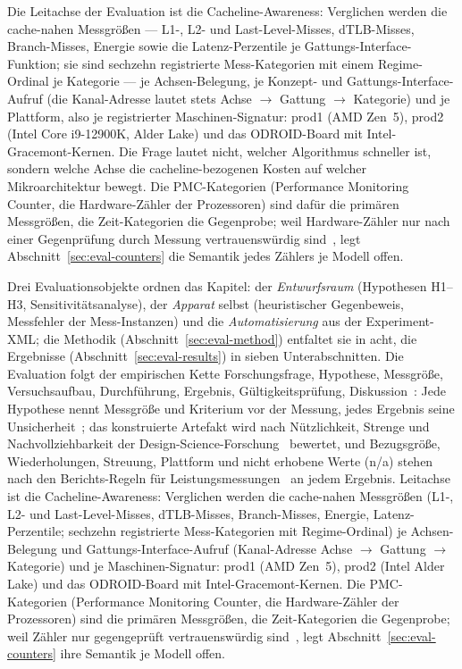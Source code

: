 \begin{nurlang}
Die Leitachse der Evaluation ist die Cacheline-Awareness: Verglichen werden die cache-nahen
Messgrößen --- L1-, L2- und Last-Level-Misses, dTLB-Misses, Branch-Misses, Energie sowie die
Latenz-Perzentile je Gattungs-Interface-Funktion; sie sind sechzehn registrierte Mess-Kategorien mit einem
Regime-Ordinal je Kategorie --- je Achsen-Belegung, je Konzept- und Gattungs-Interface-Aufruf (die
Kanal-Adresse lautet stets Achse $\to$ Gattung $\to$ Kategorie) und je Plattform, also je registrierter
Maschinen-Signatur: prod1 (AMD Zen~5), prod2 (Intel Core i9-12900K, Alder Lake) und das ODROID-Board
mit Intel-Gracemont-Kernen. Die Frage lautet nicht, welcher Algorithmus schneller ist, sondern welche
Achse die cacheline-bezogenen Kosten auf welcher Mikroarchitektur bewegt. Die PMC-Kategorien
(Performance Monitoring Counter, die Hardware-Zähler der Prozessoren) sind dafür die primären
Messgrößen, die Zeit-Kategorien die Gegenprobe; weil Hardware-Zähler nur nach einer Gegenprüfung durch
Messung vertrauenswürdig sind~\cite{weaver2008counters}, legt Abschnitt~\ref{sec:eval-counters} die
Semantik jedes Zählers je Modell offen.
\end{nurlang}
\begin{nurkurz}
Drei Evaluationsobjekte ordnen das Kapitel: der \emph{Entwurfsraum} (Hypothesen H1--H3,
Sensitivitätsanalyse), der \emph{Apparat} selbst (heuristischer Gegenbeweis, Messfehler der Mess-Instanzen)
und die \emph{Automatisierung} aus der Experiment-XML\@; die Methodik (Abschnitt~\ref{sec:eval-method})
entfaltet sie in acht, die Ergebnisse (Abschnitt~\ref{sec:eval-results}) in sieben Unterabschnitten. Die
Evaluation folgt der empirischen Kette Forschungsfrage, Hypothese, Messgröße, Versuchsaufbau, Durchführung,
Ergebnis, Gültigkeitsprüfung, Diskussion~\cite{wohlin2012experimentation,shaw2003writing}: Jede Hypothese
nennt Messgröße und Kriterium vor der Messung, jedes Ergebnis seine
Unsicherheit~\cite{georges2007rigorous,kalibera2013rigorous}; das konstruierte Artefakt wird nach
Nützlichkeit, Strenge und Nachvollziehbarkeit der
Design-Science-Forschung~\cite{hevner2004designscience,peffers2007dsrm,wieringa2014designscience} bewertet,
und Bezugsgröße, Wiederholungen, Streuung, Plattform und nicht erhobene Werte (n/a) stehen nach den
Berichts-Regeln für Leistungsmessungen~\cite{hoefler2015benchmarking,blackburn2016truth} an jedem Ergebnis.
Leitachse ist die Cacheline-Awareness: Verglichen werden die cache-nahen Messgrößen (L1-, L2- und
Last-Level-Misses, dTLB-Misses, Branch-Misses, Energie, Latenz-Perzentile; sechzehn registrierte
Mess-Kategorien mit Regime-Ordinal) je Achsen-Belegung und Gattungs-Interface-Aufruf (Kanal-Adresse Achse
$\to$ Gattung $\to$ Kategorie) und je Maschinen-Signatur: prod1 (AMD Zen~5), prod2 (Intel Alder Lake) und
das ODROID-Board mit Intel-Gracemont-Kernen. Die PMC-Kategorien (Performance Monitoring Counter, die
Hardware-Zähler der Prozessoren) sind die primären Messgrößen, die Zeit-Kategorien die Gegenprobe; weil
Zähler nur gegengeprüft vertrauenswürdig sind~\cite{weaver2008counters}, legt
Abschnitt~\ref{sec:eval-counters} ihre Semantik je Modell offen.
\end{nurkurz}


